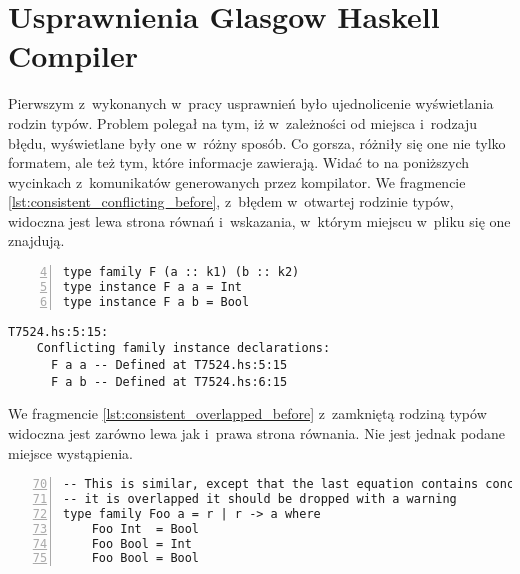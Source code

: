 \chapter{Usprawnienia Glasgow Haskell Compiler}\label{chap:badania}

\label{sec:zgloszenie_10839}

Pierwszym z~wykonanych w~pracy usprawnień było ujednolicenie wyświetlania rodzin
typów. Problem polegał na tym, iż w~zależności od miejsca i~rodzaju błędu,
wyświetlane były one w~różny sposób. Co gorsza, różniły się one nie tylko
formatem, ale też tym, które informacje zawierają. Widać to na poniższych
wycinkach z~komunikatów generowanych przez kompilator. We fragmencie
\ref{lst:consistent_conflicting_before}, z~błędem w~otwartej rodzinie typów,
widoczna jest lewa strona równań i~wskazania, w~którym miejscu w~pliku się one
znajdują.

\begin{lstlisting}[float,numbers=left,firstnumber=4,label={lst:consistent_conflicting_code},
                   caption={Fragment testu T7524 z dwoma równaniami otwartej rodziny typów będącymi w konflikcie.}]
type family F (a :: k1) (b :: k2)
type instance F a a = Int
type instance F a b = Bool
\end{lstlisting}

\begin{lstlisting}[float,language={},label={lst:consistent_conflicting_before},
                   caption={Błąd generowany przez kompilator w przypadku \ref{lst:consistent_conflicting_code} przed wprowadzeniem zmian.}]
T7524.hs:5:15:
    Conflicting family instance declarations:
      F a a -- Defined at T7524.hs:5:15
      F a b -- Defined at T7524.hs:6:15
\end{lstlisting}

We fragmencie \ref{lst:consistent_overlapped_before} z~zamkniętą rodziną typów
widoczna jest zarówno lewa jak i~prawa strona równania.
Nie jest jednak podane miejsce wystąpienia.

\begin{lstlisting}[float,numbers=left,firstnumber=70,label={lst:consistent_overlapped_code},
                   caption={Fragment testu T6018 z zamkniętą rodziną typów z równaniami o nachodzących na siebie dziedzinach.}]
-- This is similar, except that the last equation contains concrete type.  Since
-- it is overlapped it should be dropped with a warning
type family Foo a = r | r -> a where
    Foo Int  = Bool
    Foo Bool = Int
    Foo Bool = Bool
\end{lstlisting}

